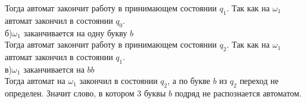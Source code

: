 \documentclass[12pt]{article}
\theoremstyle{definiton}
\theoremstyle{definition}
\theoremstyle{definition}
\let\om\omega
\begin{document}
	\hspace*{1cm} Тогда автомат закончит работу в принимающем состоянии $ q_1 $. Так как на $ \om_1 $ автомат закончил в состоянии $ q_0 $.\\
	\hspace*{0.5cm} б)$ \om_1 $ заканчивается на одну букву $ b $\\
	\hspace*{1cm} Тогда автомат закончит работу в принимающем состоянии $ q_2 $. Так как на $ \om_1 $ автомат закончил в состоянии $ q_1 $.\\
	\hspace*{0.5cm} в)$ \om_1 $ заканчивается на $ bb $\\
		Тогда автомат на $ \om_1 $ закончил в состоянии $ q_2 $, а по букве $ b $ из $ q_2 $ переход не определен. Значит слово, в котором 3 буквы $ b $ подряд не распознается автоматом. 
 
\end{document}
